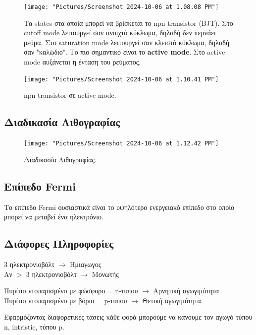 \documentclass[11pt, oneside]{memoir}   	%
\begin{document}
\begin{figure}[H]
	\centering
	\texttt{[image: "Pictures/Screenshot 2024-10-06 at 1.08.08 PM"]}
	\caption{Τα states στα οποία μπορεί να βρίσκεται το npn transistor (BJT). Στο cutoff mode λειτουργεί σαν ανοιχτό κύκλωμα, δηλαδή δεν περνάει ρεύμα. Στο saturation mode λειτουργεί σαν κλειστό κύκλωμα, δηλαδή σαν "καλώδιο". Το πιο σημαντικό είναι το \textbf{active mode}. Στο active mode αυξάνεται η ένταση του ρεύματος.}
	\label{fig:screenshot-2024-10-06-at-1}
\end{figure}

\begin{figure}[H]
	\centering
	\texttt{[image: "Pictures/Screenshot 2024-10-06 at 1.10.41 PM"]}
	\caption{npn transistor σε active mode.}
	\label{fig:screenshot-2024-10-06-at-1}
\end{figure}

\subsection{Διαδικασία Λιθογραφίας}

\begin{figure}[H]
	\centering
	\texttt{[image: "Pictures/Screenshot 2024-10-06 at 1.12.42 PM"]}
	\caption{Διαδικασία Λιθογραφίας.}
	\label{fig:screenshot-2024-10-06-at-1}
\end{figure}

\subsection{Επίπεδο Fermi}

Το επίπεδο Fermi ουσιαστικά είναι το υψηλότερο ενεργειακό επίπεδο στο οποίο μπορεί να μεταβεί ένα ηλεκτρόνιο.

\subsection{Διάφορες Πληροφορίες}

3 ηλεκτρονιοβόλτ $\rightarrow$ Ημιαγωγος\\
Αν $>$ 3 ηλεκτρονιοβόλτ $\rightarrow$ Μονωτής

Πυρίτιο ντοπαρισμένο με φώσφορο = n-τυπου $\rightarrow$ Αρνητική αγωγιμότητα \\
Πυρίτιο ντοπαρισμένο με βόριο = p-τυπου $\rightarrow$ Θετική αγωγιμότητα.

Εφαρμόζοντας διαφορετικές τάσεις κάθε φορά μπορούμε να κάνουμε τον αγωγό τύπου n, intristic, τύπου p.
\end{document}
